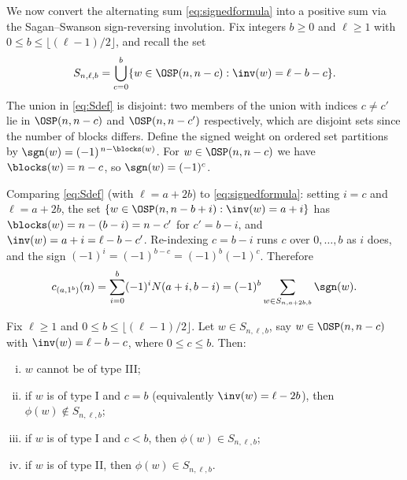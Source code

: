 We now convert the alternating sum \eqref{eq:signedformula} into a positive sum via the
Sagan--Swanson sign-reversing involution. Fix integers $b\ge0$ and $\ell\ge1$ with
$0\le b\le \lfloor (\ell-1)/2\rfloor$, and recall the set
\begin{equation}\label{eq:Sdef}
S_{n,\ell,b}=\bigcup_{c=0}^{b}\{w\in\OSP(n,n-c):\inv(w)=\ell-b-c\}.
\end{equation}
The union in \eqref{eq:Sdef} is disjoint: two members of the union with indices
$c\ne c'$ lie in $\OSP(n,n-c)$ and $\OSP(n,n-c')$ respectively, which are disjoint sets
since the number of blocks differs. Define the signed weight on ordered set partitions by
$\sgn(w)=(-1)^{\,n-\blocks(w)}$. For $w\in\OSP(n,n-c)$ we have $\blocks(w)=n-c$, so
$\sgn(w)=(-1)^c$.

Comparing \eqref{eq:Sdef} (with $\ell=a+2b$) to \eqref{eq:signedformula}: setting $i=c$ and
$\ell=a+2b$, the set $\{w\in\OSP(n,n-b+i):\inv(w)=a+i\}$ has $\blocks(w)=n-(b-i)=n-c'$ for
$c'=b-i$, and $\inv(w)=a+i=\ell-b-c'$. Re-indexing $c=b-i$ runs $c$ over $0,\dots,b$ as $i$
does, and the sign $(-1)^i=(-1)^{b-c}=(-1)^b(-1)^c$. Therefore
\begin{equation}\label{eq:cassigned}
c_{(a,1^b)}(n)=\sum_{i=0}^{b}(-1)^i N(a+i,b-i)
=(-1)^b\sum_{w\in S_{n,a+2b,b}}\sgn(w).
\end{equation}

\begin{lemma}\label{lem:phiaction}
Fix $\ell\ge1$ and $0\le b\le\lfloor(\ell-1)/2\rfloor$. Let $w\in S_{n,\ell,b}$, say
$w\in\OSP(n,n-c)$ with $\inv(w)=\ell-b-c$, where $0\le c\le b$. Then:
\begin{enumerate}[(i)]
\item $w$ cannot be of type III;
\item if $w$ is of type I and $c=b$ (equivalently $\inv(w)=\ell-2b$), then
$\phi(w)\notin S_{n,\ell,b}$;
\item if $w$ is of type I and $c<b$, then $\phi(w)\in S_{n,\ell,b}$;
\item if $w$ is of type II, then $\phi(w)\in S_{n,\ell,b}$.
\end{enumerate}
\end{lemma}

